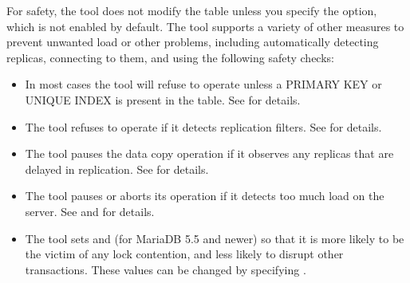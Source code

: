 \documentclass[letterpaper,10pt,english]{sphinxmanual}
\begin{document}
For safety, the tool does not modify the table unless you specify the
{\hyperref[\detokenize{mariadb-schema-change:cmdoption-mariadb-schema-change-execute}]{}} option, which is not enabled by default.  The tool supports a
variety of other measures to prevent unwanted load or other problems, including
automatically detecting replicas, connecting to them, and using the following
safety checks:
\begin{itemize}
\item {} 
In most cases the tool will refuse to operate unless a PRIMARY KEY or UNIQUE INDEX is
present in the table. See {\hyperref[\detokenize{mariadb-schema-change:cmdoption-mariadb-schema-change-alter}]{}} for details.

\item {} 
The tool refuses to operate if it detects replication filters. See
{\hyperref[\detokenize{mariadb-schema-change:cmdoption-mariadb-schema-change-no-check-replication-filters}]{}} for details.

\item {} 
The tool pauses the data copy operation if it observes any replicas that are
delayed in replication. See {\hyperref[\detokenize{mariadb-schema-change:cmdoption-mariadb-schema-change-max-lag}]{}} for details.

\item {} 
The tool pauses or aborts its operation if it detects too much load on the
server. See {\hyperref[\detokenize{mariadb-schema-change:cmdoption-mariadb-schema-change-max-load}]{}} and {\hyperref[\detokenize{mariadb-schema-change:cmdoption-mariadb-schema-change-critical-load}]{}} for details.

\item {} 
The tool sets  and (for MariaDB 5.5 and newer)
 so that it is more likely to be the victim of any
lock contention, and less likely to disrupt other transactions.  These
values can be changed by specifying {\hyperref[\detokenize{mariadb-schema-change:cmdoption-mariadb-schema-change-set-vars}]{}}.


\end{itemize}
\end{document}
